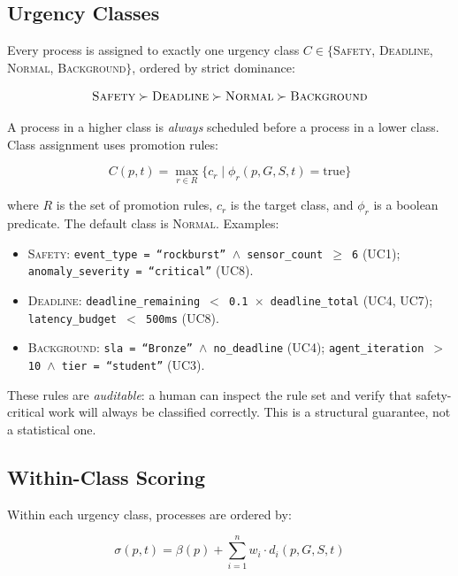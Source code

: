 \documentclass[conference]{IEEEtran}
\begin{document}
\subsection{Urgency Classes}

Every process is assigned to exactly one urgency class $C \in \{$\textsc{Safety}, \textsc{Deadline}, \textsc{Normal}, \textsc{Background}$\}$, ordered by strict dominance:

\begin{equation}
    \textsc{Safety} \succ \textsc{Deadline} \succ \textsc{Normal} \succ \textsc{Background}
\end{equation}

A process in a higher class is \emph{always} scheduled before a process in a lower class. Class assignment uses promotion rules:

\begin{equation}
    C(p, t) = \max_{r \in R} \{ c_r \mid \phi_r(p, G, S, t) = \text{true} \}
\end{equation}

where $R$ is the set of promotion rules, $c_r$ is the target class, and $\phi_r$ is a boolean predicate. The default class is \textsc{Normal}. Examples:

\begin{itemize}
    \item \textsc{Safety}: \texttt{event\_type = ``rockburst'' $\wedge$ sensor\_count $\geq$ 6} (UC1); \texttt{anomaly\_severity = ``critical''} (UC8).
    \item \textsc{Deadline}: \texttt{deadline\_remaining $<$ 0.1 $\times$ deadline\_total} (UC4, UC7); \texttt{latency\_budget $<$ 500ms} (UC8).
    \item \textsc{Background}: \texttt{sla = ``Bronze'' $\wedge$ no\_deadline} (UC4); \texttt{agent\_iteration $>$ 10 $\wedge$ tier = ``student''} (UC3).
\end{itemize}

These rules are \emph{auditable}: a human can inspect the rule set and verify that safety-critical work will always be classified correctly. This is a structural guarantee, not a statistical one.

\subsection{Within-Class Scoring}

Within each urgency class, processes are ordered by:

\begin{equation}
    \sigma(p, t) = \beta(p) + \sum_{i=1}^{n} w_i \cdot d_i(p, G, S, t)
    \label{eq:score}
\end{equation}
\end{document}
